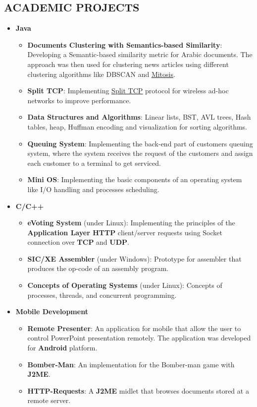 \documentclass{res}
\begin{document}
\begin{resume}
 
\section{ACADEMIC PROJECTS}          
	\begin{itemize}
	\item \textbf{Java}
		\begin{itemize}		
		\item \textbf{Documents Clustering with Semantics-based Similarity}: Developing a Semantic-based similarity metric for Arabic documents. The approach was then used for clustering news articles using different clustering algorithms like DBSCAN and \href{http://www.sciencedirect.com/science/article/pii/S0031320308003701}{\underline{Mitosis}}.
		\item \textbf{Split TCP}: Implementing \href{http://www.cs.ucr.edu/~krish/splittcp.pdf}{\underline{Split TCP}} protocol for wireless ad-hoc networks to improve performance.
		\item \textbf{Data Structures and Algorithms}: Linear lists, BST, AVL trees, Hash tables, heap, Huffman encoding and visualization for sorting algorithms.
		\item \textbf{Queuing System}: Implementing the back-end part of customers queuing system, where the system receives the request of the customers and assign each customer to a terminal to get serviced.
		\item \textbf{Mini OS}: Implementing the basic components of an operating system like I/O handling and processes scheduling.
		\end{itemize}

	\item \textbf{C/C++}
		\begin{itemize}
		\item \textbf{eVoting System} (under Linux): Implementing the principles of the \textbf{Application Layer HTTP} client/server requests using Socket connection over \textbf{TCP} and \textbf{UDP}. 
		\item \textbf{SIC/XE Assembler} (under Windows): Prototype for assembler that produces the op-code of an assembly program.
		\item \textbf{Concepts of Operating Systems} (under Linux): Concepts of processes, threads, and concurrent programming.
		\end{itemize}
		
	\item \textbf{Mobile Development}
		\begin{itemize}
		\item \textbf{Remote Presenter}: An application for mobile that allow the user to control PowerPoint presentation remotely. The application was developed for \textbf{Android} platform.
		\item \textbf{Bomber-Man}: An implementation for the Bomber-man game with \textbf{J2ME}.
		\item \textbf{HTTP-Requests}: A \textbf{J2ME} midlet that browses documents stored at a remote server.
		\end{itemize}
		

\end{itemize}
\end{resume}
\end{document}

